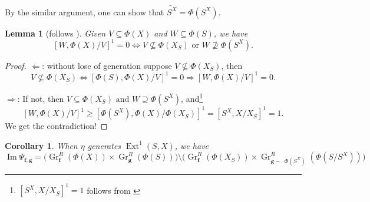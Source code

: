 \documentclass[reqno,11pt]{amsart}
\numberwithin{equation}{section}
\theoremstyle{plain}
\newtheorem{lemma}[theorem]{Lemma}
\newtheorem{corollary}[theorem]{Corollary}
\theoremstyle{plain}
\numberwithin{equation}{section}
\theoremstyle{remark}
\DeclareMathOperator{\Img}{\operatorname{Im}}
\DeclareMathOperator{\Ext}{\operatorname{Ext}}
\DeclareMathOperator{\dimv}{\operatorname{\underline{\mathbf{dim}}}}
\newcommand{\Grr}{\operatorname{Gr}^{R}}
\newcommand{\dimvec}[1]{\mathbf{#1}}
\begin{document}
By the similar argument, one can show that $\widetilde{S^X}=\Phi(S^X)$.
\begin{lemma}[follows {\cite[Lemma 31(6)]{irelli2019cell}}]
Given $V \subseteq \Phi(X)$ and $W \subseteq \Phi(S)$, we have 
$$[W,\Phi(X)/V]^1=0 \iff V \nsubseteq \Phi(X_S) \text{ or }W \nsupseteq \Phi(S^X).$$
\end{lemma}
\begin{proof}
$\Leftarrow$: without lose of generation suppose $V \nsubseteq \Phi(X_S)$, then
$$V \nsubseteq \Phi(X_S) \iff [\Phi(S),\Phi(X)/V ]^1=0 \Rightarrow  [W,\Phi(X)/V ]^1=0.$$

\hspace{0.8cm}$\Rightarrow$: If not, then $V \subseteq \Phi(X_S) \text{ and }W \supseteq \Phi(S^X)$, and\footnote{$[S^X,X/X_S]^1=1$ follows from \cite[Lemma 31(5)]{irelli2019cell}} 
$$[W,\Phi(X)/V]^1 \geqslant [\Phi(S^X),\Phi(X)/\Phi(X_S)]^1 =[S^X,X/X_S]^1=1.$$
We get the contradiction!
\end{proof}
\begin{corollary}\label{cor:img2}
When $\eta$ generates $\Ext^1(S,X)$, we have 
	$$\Img \Psi_{\dimvec{f},\dimvec{g}} = \bigg(\Grr_{\dimvec{f}}(\Phi(X)) \times \Grr_{\dimvec{g}}(\Phi(S)) \bigg) \setminus \bigg(\Grr_{\dimvec{f}}(\Phi(X_S)) \times \Grr_{\dimvec{g}-\dimv \Phi(S^X)}\left(\Phi(S/S^X)\right) \bigg)$$
\end{corollary}
\end{document}
